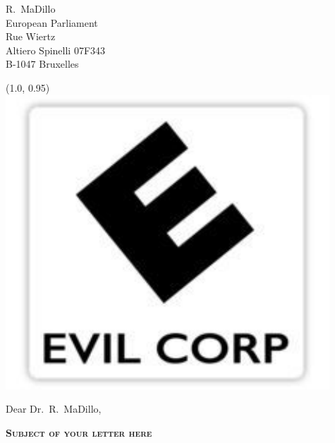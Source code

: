 \documentclass[a4paper,12pt]{letter}
\date{February 31, 2013}
\begin{document}
\begin{letter}{
	R.\ MaDillo\\
	European Parliament\\
	Rue Wiertz\\
	Altiero Spinelli 07F343\\
	B-1047 Bruxelles 
}

\begin{textblock}{10}(1.0, 0.95)
	\includegraphics[scale=0.4]{letter_logo}
\end{textblock}

\opening{Dear Dr.\ R.\ MaDillo,}
{
\begin{center}
	\textbf{\textsc{Subject of your letter here}}\\[2em]
\end{center}
}

% 
%
%


\end{letter}
\end{document}
